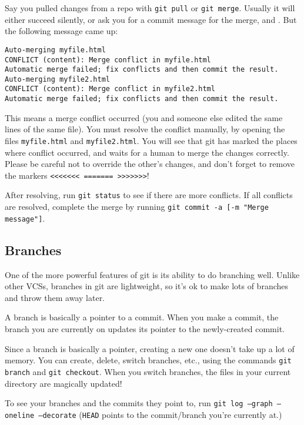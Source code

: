 \documentclass[12pt]{article}
\begin{document}
Say you pulled changes from a repo with \texttt{git pull} or \texttt{git merge}. Usually it will either succeed silently, or ask you for a commit message for the merge, and . But the following message came up:

\texttt{Auto-merging myfile.html\\
CONFLICT (content): Merge conflict in myfile.html\\
Automatic merge failed; fix conflicts and then commit the result.\\
Auto-merging myfile2.html\\
CONFLICT (content): Merge conflict in myfile2.html\\
Automatic merge failed; fix conflicts and then commit the result.
}

This means a merge conflict occurred (you and someone else edited the same lines of the same file). You must resolve the conflict manually, by opening the files \texttt{myfile.html} and \texttt{myfile2.html}. You will see that git has marked the places where conflict occurred, and waits for a human to merge the changes correctly. Please be careful not to override the other's changes, and don't forget to remove the markers \texttt{<<<<<<< ======= >>>>>>>}!

After resolving, run \texttt{git status} to see if there are more conflicts. If all conflicts are resolved, complete the merge by running \texttt{git commit -a [-m "Merge message"]}.

\subsection{Branches}
One of the more powerful features of git is its ability to do branching well. Unlike other VCSs, branches in git are lightweight, so it's ok to make lots of branches and throw them away later.

A branch is basically a pointer to a commit. When you make a commit, the branch you are currently on updates its pointer to the newly-created commit.

Since a branch is basically a pointer, creating a new one doesn't take up a lot of memory. You can create, delete, switch branches, etc., using the commands \texttt{git branch} and \texttt{git checkout}. When you switch branches, the files in your current directory are magically updated!

To see your branches and the commits they point to, run \texttt{git log --graph --oneline --decorate} (\texttt{HEAD} points to the commit/branch you're currently at.)
\end{document}

